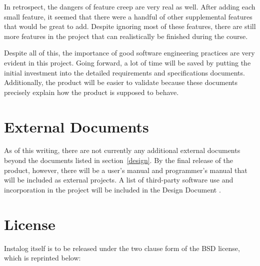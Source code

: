 \documentclass[letterpaper,12pt]{article}
\begin{document}
In retrospect, the dangers of feature creep are very real as well.  After adding
each small feature, it seemed that there were a handful of other supplemental
features that would be great to add.  Despite ignoring most of these features,
there are still more features in the project that can realistically be finished
during the course.  

Despite all of this, the importance of good software engineering practices are
very evident in this project.  Going forward, a lot of time will be saved by
putting the initial investment into the detailed requirements and specifications
documents.  Additionally, the product will be easier to validate because these
documents precisely explain how the product is supposed to behave. 

\newpage



\section{External Documents} \label{documents}
As of this writing, there are not currently any additional external documents
beyond the documents listed in section~\ref{design}.  By the final release of
the product, however, there will be a user's manual and programmer's manual that
will be included as external projects.  A list of third-party software use and
incorporation in the project will be included in the Design Document
\cite{Design}.

\newpage



{} 


\newpage



\appendix
\section{License} \label{license}
Instalog itself is to be released under the two clause form of the BSD license,
which is reprinted below:
\end{document}
